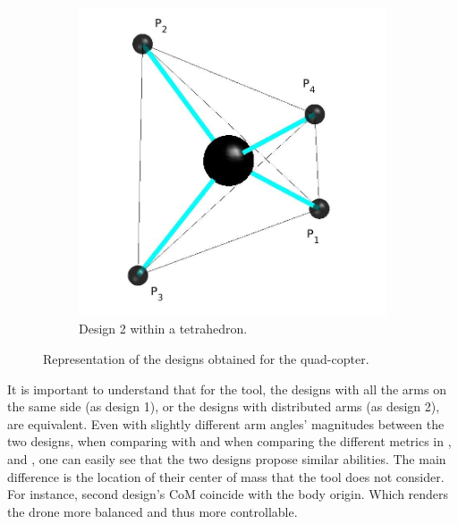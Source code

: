 {\begin{figure}[!ht]
{  \hspace*{\fill} %
  \begin{subfigure}[b]{0.4\textwidth}
    \includegraphics[width=\linewidth]{images/Quad_tetrahedron.jpg}
    \caption{Design 2 within a tetrahedron.} \label{fig:Quadcopter_2_tetra}
  \end{subfigure}}
  \caption{Representation of the designs obtained for the quad-copter.}
  \label{fig:Quadcopter_result}
\end{figure}

It is important to understand that for the tool, the designs with all the arms
on the same side (as design 1), or the designs with distributed arms (as design 2),
are equivalent. Even with slightly different arm angles’ magnitudes
between the two designs, when comparing with
 and when comparing the different metrics
in ,  and
, one can easily see that the two designs
propose similar abilities. The main difference is the location of their center of mass
that the tool does not consider. For instance, second design’s CoM coincide with
the body origin. Which renders the drone more balanced and thus more controllable.

}
